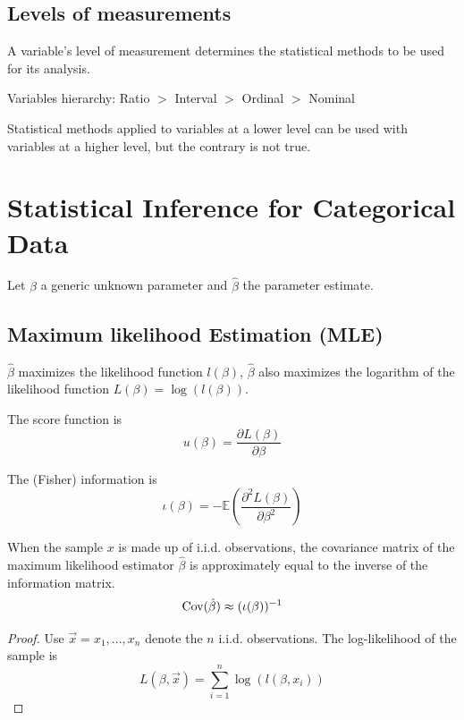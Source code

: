 \documentclass[11pt]{elegantbook}
\begin{document}
\subsection*{Levels of measurements}
A variable's level of measurement determines the statistical methods to be used for its analysis.
\begin{center}
    Variables hierarchy: Ratio $>$ Interval $>$ Ordinal $>$ Nominal
\end{center}
Statistical methods applied to variables at a lower level can be used with variables at a higher level, but the contrary is not true.

\section{Statistical Inference for Categorical Data}
Let $\beta$ a generic unknown parameter and $\hat{\beta}$ the parameter estimate.
\subsection{Maximum likelihood Estimation (MLE)}
$\hat{\beta}$ maximizes the likelihood function $l(\beta)$, $\hat{\beta}$ also maximizes the logarithm of the likelihood function $L(\beta) = \log(l(\beta))$.

\begin{definition}
    The score function is $$u(\beta)=\frac{\partial L(\beta)}{\partial \beta}$$
\end{definition}

\begin{definition}
    The (Fisher) information is $$\iota(\beta)=-\mathbb{E}\left(\frac{\partial^2 L(\beta)}{\partial \beta^2}\right)$$
\end{definition}

\begin{proposition}
    When the sample $x$ is made up of i.i.d. observations, the covariance matrix of the maximum likelihood estimator $\hat{\beta}$ is approximately equal to the inverse of the information matrix. $$\textnormal{Cov}(\hat{\beta})\approx(\iota(\beta))^{-1}$$
\end{proposition}
\begin{proof}
    Use $\vec{x}=x_1,...,x_n$ denote the $n$ i.i.d. observations. The log-likelihood of the sample is $$L(\beta,\vec{x})=\sum_{i=1}^n\log(l(\beta,x_i))$$
\end{proof}
\end{document}
